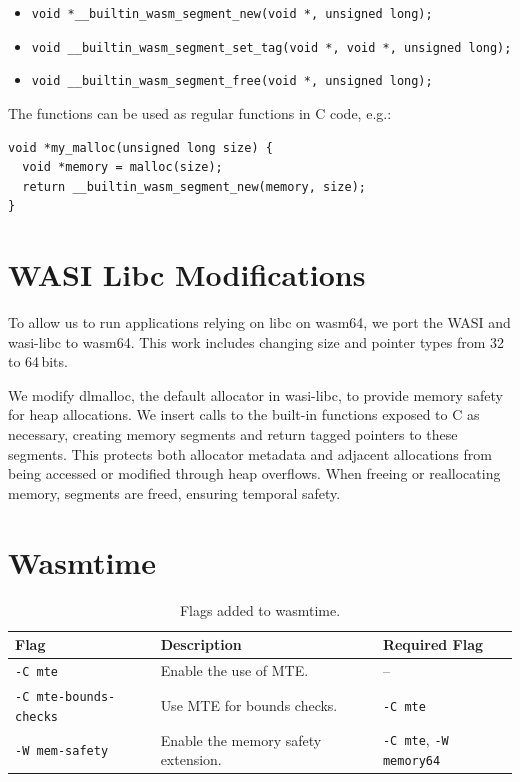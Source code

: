 \begin{itemize}
  \item \lstinline[style=customc]{void *__builtin_wasm_segment_new(void *, unsigned long);}
  \item \lstinline[style=customc]{void __builtin_wasm_segment_set_tag(void *, void *, unsigned long);}
  \item \lstinline[style=customc]{void __builtin_wasm_segment_free(void *, unsigned long);}
\end{itemize}

The functions can be used as regular functions in C code, e.g.:

\begin{lstlisting}[frame=h,style=customc,
  label={lst:builtin-functions}]
void *my_malloc(unsigned long size) {
  void *memory = malloc(size);
  return __builtin_wasm_segment_new(memory, size);
}
\end{lstlisting}

\section{WASI Libc Modifications}
\label{sec:wasi-libc}

To allow us to run applications relying on libc on wasm64, we port the \acf{WASI} and wasi-libc to wasm64.
This work includes changing size and pointer types from 32 to 64\,bits.

We modify dlmalloc, the default allocator in wasi-libc, to provide memory safety for heap allocations.
We insert calls to the built-in functions exposed to C as necessary, creating memory segments and return tagged pointers to these segments.
This protects both allocator metadata and adjacent allocations from being accessed or modified through heap overflows.
When freeing or reallocating memory, segments are freed, ensuring temporal safety.

\section{Wasmtime}
\label{sec:wasm-runtime}

\begin{table}[t]
  \centering
  \begin{tabular}{l | l | l}
    \textbf{Flag} & \textbf{Description} & \textbf{Required Flag} \\
    \hline
    \texttt{-C mte}               & Enable the use of \ac{MTE}. & -- \\
    \texttt{-C mte-bounds-checks} & Use \ac{MTE} for bounds checks. & \texttt{-C mte} \\
    \texttt{-W mem-safety}        & Enable the memory safety extension. & \texttt{-C mte}, \texttt{-W memory64} \\
  \end{tabular}
  \caption{Flags added to wasmtime.}
  \label{tab:wasmtime-flags}
\end{table}

